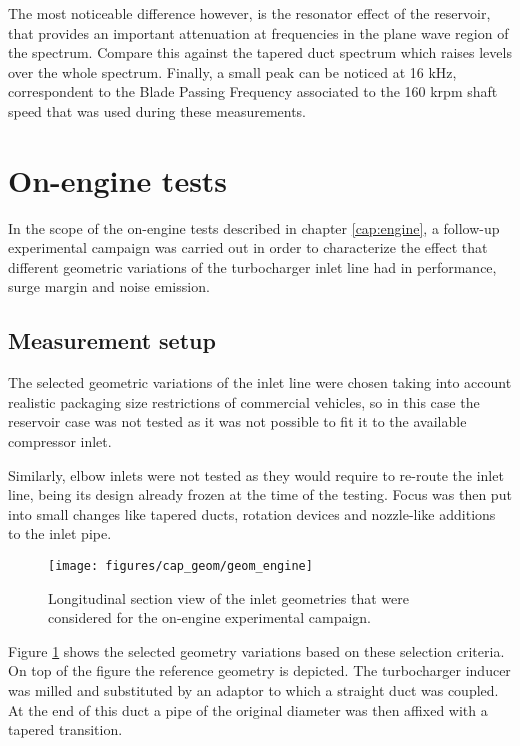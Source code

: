 The most noticeable difference however, is the resonator effect of the reservoir, that provides an important attenuation at frequencies in the plane wave region of the spectrum. Compare this against the tapered duct spectrum which raises levels over the whole spectrum. Finally, a small peak can be noticed at 16 kHz, correspondent to the Blade Passing Frequency  associated to the 160 krpm shaft speed that was used during these measurements.

\section{On-engine tests}
\label{sec:geom_motor}

In the scope of the on-engine tests described in chapter \ref{cap:engine}, a follow-up experimental campaign was carried out in order to characterize the effect that different geometric variations of the turbocharger inlet line had in performance, surge margin and noise emission.

\subsection{Measurement setup}

The selected geometric variations of the inlet line were chosen taking into account realistic packaging size restrictions of commercial vehicles, so in this case the reservoir case was not tested as it was not possible to fit it to the available compressor inlet. 

Similarly, elbow inlets were not tested as they would require to re-route the inlet line, being its design already frozen at the time of the testing. Focus was then put into small changes like tapered ducts, rotation devices and nozzle-like additions to the inlet pipe.

\begin{figure}[htb!]
\centering
\texttt{[image: figures/cap\_geom/geom\_engine]}
\caption[Section view of the inlet geometries (engine test)]{Longitudinal section view of the inlet geometries that were considered for the on-engine experimental campaign.}
\label{fig:geom_engine}
\end{figure}

Figure \ref{fig:geom_engine} shows the selected geometry variations based on these selection criteria. On top of the figure the reference geometry is depicted. The turbocharger inducer was milled and substituted by an adaptor to which a straight duct was coupled. At the end of this duct a pipe of the original diameter was then affixed with a tapered transition.


